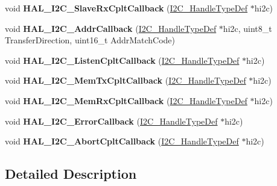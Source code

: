 \begin{DoxyCompactItemize}
\item 
\mbox{\label{group___i2_c___i_r_q___handler__and___callbacks_gae23a5b1ce68867c35093ff2b5931e9a0}} 
void {\bfseries H\+A\+L\+\_\+\+I2\+C\+\_\+\+Slave\+Rx\+Cplt\+Callback} (\mbox{\hyperlink{struct_____i2_c___handle_type_def}{I2\+C\+\_\+\+Handle\+Type\+Def}} $\ast$hi2c)
\item 
\mbox{\label{group___i2_c___i_r_q___handler__and___callbacks_ga3b2a6a0ff585d8e529a73ba7d291c92d}} 
void {\bfseries H\+A\+L\+\_\+\+I2\+C\+\_\+\+Addr\+Callback} (\mbox{\hyperlink{struct_____i2_c___handle_type_def}{I2\+C\+\_\+\+Handle\+Type\+Def}} $\ast$hi2c, uint8\+\_\+t Transfer\+Direction, uint16\+\_\+t Addr\+Match\+Code)
\item 
\mbox{\label{group___i2_c___i_r_q___handler__and___callbacks_ga22544d1e6a14392cd5fe41e4e4f4cc96}} 
void {\bfseries H\+A\+L\+\_\+\+I2\+C\+\_\+\+Listen\+Cplt\+Callback} (\mbox{\hyperlink{struct_____i2_c___handle_type_def}{I2\+C\+\_\+\+Handle\+Type\+Def}} $\ast$hi2c)
\item 
\mbox{\label{group___i2_c___i_r_q___handler__and___callbacks_ga874f6104d2cdbced9f2ab6e941ec58f0}} 
void {\bfseries H\+A\+L\+\_\+\+I2\+C\+\_\+\+Mem\+Tx\+Cplt\+Callback} (\mbox{\hyperlink{struct_____i2_c___handle_type_def}{I2\+C\+\_\+\+Handle\+Type\+Def}} $\ast$hi2c)
\item 
\mbox{\label{group___i2_c___i_r_q___handler__and___callbacks_gac16a95413b35f05c5ce725fefd8531a5}} 
void {\bfseries H\+A\+L\+\_\+\+I2\+C\+\_\+\+Mem\+Rx\+Cplt\+Callback} (\mbox{\hyperlink{struct_____i2_c___handle_type_def}{I2\+C\+\_\+\+Handle\+Type\+Def}} $\ast$hi2c)
\item 
\mbox{\label{group___i2_c___i_r_q___handler__and___callbacks_ga4d5338cd64a656dfdc4154773bc4f05d}} 
void {\bfseries H\+A\+L\+\_\+\+I2\+C\+\_\+\+Error\+Callback} (\mbox{\hyperlink{struct_____i2_c___handle_type_def}{I2\+C\+\_\+\+Handle\+Type\+Def}} $\ast$hi2c)
\item 
\mbox{\label{group___i2_c___i_r_q___handler__and___callbacks_gaa4c2f59ea15698a1490401e5bbc3f296}} 
void {\bfseries H\+A\+L\+\_\+\+I2\+C\+\_\+\+Abort\+Cplt\+Callback} (\mbox{\hyperlink{struct_____i2_c___handle_type_def}{I2\+C\+\_\+\+Handle\+Type\+Def}} $\ast$hi2c)
\end{DoxyCompactItemize}


\subsection{Detailed Description}
